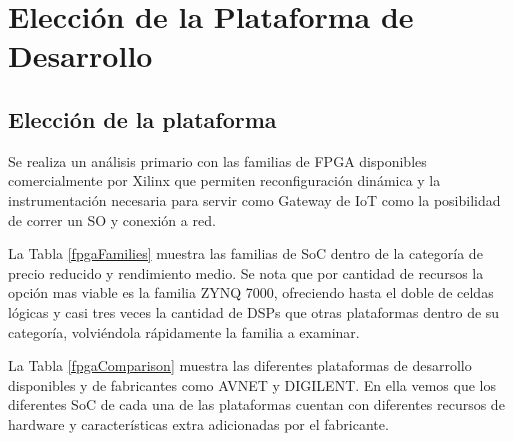 \chapter{Elección de la Plataforma de Desarrollo} %
\label{Chapter8.5}

\section{Elección de la plataforma}

Se realiza un análisis primario con las familias de FPGA disponibles comercialmente por Xilinx que permiten reconfiguración dinámica y la instrumentación necesaria para servir como Gateway de IoT como la posibilidad de correr un SO y conexión a red.

La Tabla \ref{fpgaFamilies} muestra las familias de SoC dentro de la categoría de precio reducido y rendimiento medio. Se nota que por cantidad de recursos la opción mas viable es la familia ZYNQ 7000, ofreciendo hasta el doble de celdas lógicas y casi tres veces la cantidad de DSPs que otras plataformas dentro de su categoría, volviéndola rápidamente la familia a examinar.

\begin{table}[h!]
\centering
{}
\caption{Familias de FPGA}
\label{fpgaFamilies}
\end{table}

La Tabla \ref{fpgaComparison} muestra las diferentes plataformas de desarrollo  disponibles y de fabricantes como AVNET y DIGILENT. En ella vemos que los diferentes SoC de cada una de las plataformas cuentan con diferentes recursos de hardware y características extra adicionadas por el fabricante.

